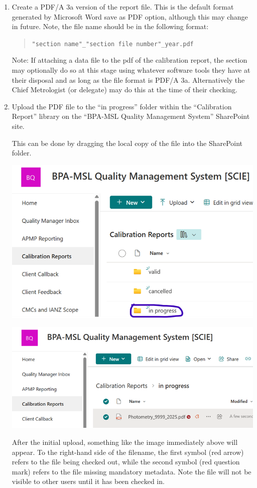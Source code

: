 \begin{enumerate}
\item Create a PDF/A 3a version of the report file.
This is the default format generated by Microsoft Word save as PDF option, although this may change in future.
Note, the file name should be in the following format:
\begin{quote}
\texttt{"section name"\_"section file number"\_year.pdf}
\end{quote}
Note:  If attaching a data file to the pdf of the calibration report, the section may optionally do so at this stage using whatever software tools they have at their disposal and as long as the file format is PDF/A 3a. Alternatively the Chief Metrologist (or delegate) may do this at the time of their checking.
\item Upload the PDF file to the ``in progress'' folder within the ``Calibration Report'' library on the ``BPA-MSL Quality Management System'' SharePoint site. 

This can be done by dragging the local copy of the file into the SharePoint folder.

\begin{center}
\includegraphics[scale=.55]{pictures/Step2_pic1}
\end{center}
\begin{center}
\includegraphics[scale=.75]{pictures/Step2_pic2}
\end{center}
After the initial upload, something like the image immediately above will appear.  To the right-hand side of the filename, the first symbol (red arrow) refers to the file being checked out, while the second symbol (red question mark) refers to the file missing mandatory metadata.  Note the file will not be visible to other users until it has been checked in.


\end{enumerate}
